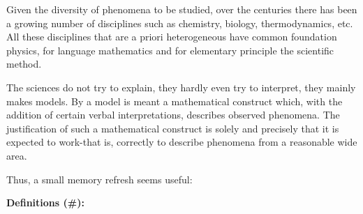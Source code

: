 	Given the diversity of phenomena to be studied, over the centuries there has been a growing number of disciplines such as chemistry, biology, thermodynamics, etc. All these disciplines that are a priori heterogeneous have common foundation physics, for language mathematics and for elementary principle the scientific method.
	
	\begin{fquote}The sciences do not try to explain, they hardly even try to interpret, they mainly makes models. By a model is meant a mathematical construct which, with the addition of certain verbal interpretations, describes observed phenomena. The justification of such a mathematical construct is solely and precisely that it is expected to work-that is, correctly to describe phenomena from a reasonable wide area.
 	\end{fquote}

	Thus, a small memory refresh seems useful:

\textbf{Definitions (\#\mydef):}

